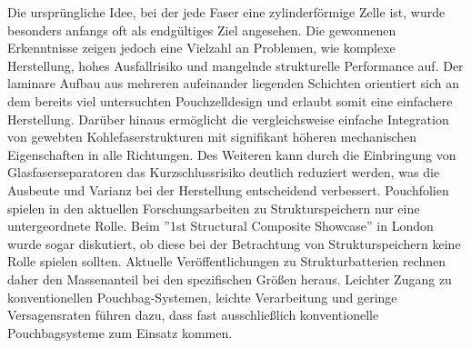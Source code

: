 Die ursprüngliche Idee, bei der jede Faser eine zylinderförmige Zelle ist, wurde besonders anfangs oft als endgültiges Ziel angesehen. Die gewonnenen Erkenntnisse zeigen jedoch eine Vielzahl an Problemen, wie komplexe Herstellung, hohes Ausfallrisiko und mangelnde strukturelle Performance auf. Der laminare Aufbau aus mehreren aufeinander liegenden Schichten orientiert sich an dem bereits viel untersuchten Pouchzelldesign und erlaubt somit eine einfachere Herstellung. Darüber hinaus ermöglicht die vergleichsweise einfache Integration von gewebten Kohlefaserstrukturen mit signifikant höheren mechanischen Eigenschaften in alle Richtungen. Des Weiteren kann durch die Einbringung von Glasfaserseparatoren das Kurzschlussrisiko deutlich reduziert werden, was die Ausbeute und Varianz bei der Herstellung entscheidend verbessert. Pouchfolien spielen in den aktuellen Forschungsarbeiten zu Strukturspeichern nur eine untergeordnete Rolle. Beim ''1st Structural Composite Showcase'' in London wurde sogar diskutiert, ob diese bei der Betrachtung von Strukturspeichern keine Rolle spielen sollten. Aktuelle Veröffentlichungen zu Strukturbatterien rechnen daher den Massenanteil bei den spezifischen Größen heraus. Leichter Zugang zu konventionellen Pouchbag-Systemen, leichte Verarbeitung und geringe Versagensraten führen dazu, dass fast ausschließlich konventionelle Pouchbagsysteme zum Einsatz kommen.

